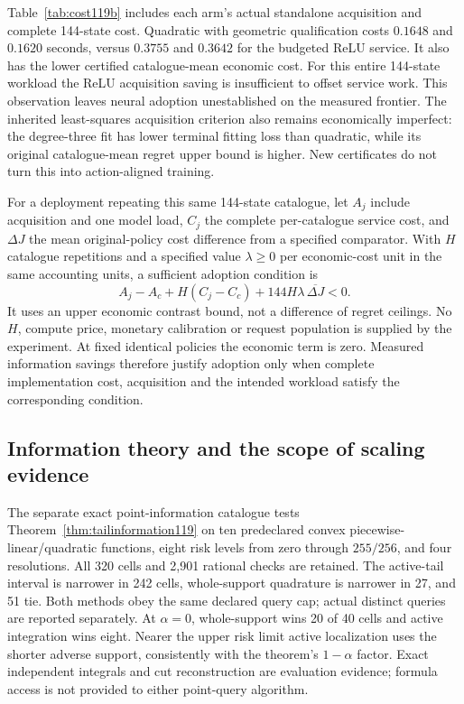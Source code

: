 Table~\ref{tab:cost119b} includes each arm's actual standalone acquisition
and complete 144-state cost.  Quadratic with geometric qualification costs
$0.1648$ and $0.1620$ seconds, versus $0.3755$ and $0.3642$ for the
budgeted ReLU service.  It also has the lower certified catalogue-mean
economic cost.  For this entire 144-state workload the ReLU acquisition
saving is insufficient to offset service work.  This observation leaves
neural adoption unestablished on the measured frontier.  The inherited
least-squares acquisition criterion also remains economically imperfect:
the degree-three fit has lower terminal fitting loss than quadratic,
while its original catalogue-mean regret upper bound is higher.  New
certificates do not turn this into action-aligned training.

For a deployment repeating this same 144-state catalogue, let $A_j$ include
acquisition and one model load, $C_j$ the complete per-catalogue service
cost, and $\Delta J$ the mean original-policy cost difference from a
specified comparator.  With $H$ catalogue repetitions and a specified
value $\lambda\ge0$ per economic-cost unit in the same accounting units,
a sufficient adoption condition is
\[
 A_j-A_c+H(C_j-C_c)+144H\lambda\,\overline{\Delta J}<0.
\]
It uses an upper economic contrast bound, not a difference of regret
ceilings.  No $H$, compute price, monetary calibration or request
population is supplied by the experiment.  At fixed identical policies
the economic term is zero.  Measured information savings therefore
justify adoption only when complete implementation cost, acquisition and
the intended workload satisfy the corresponding condition.

\subsection{Information theory and the scope of scaling evidence}
The separate exact point-information catalogue tests
Theorem~\ref{thm:tailinformation119} on ten predeclared convex
piecewise-linear/quadratic functions, eight risk levels from zero through
$255/256$, and four resolutions.  All 320 cells and 2,901 rational checks
are retained.  The active-tail interval is narrower in 242 cells,
whole-support quadrature is narrower in 27, and 51 tie.  Both methods
obey the same declared query cap; actual distinct queries are reported
separately.  At $\alpha=0$, whole-support wins 20 of 40 cells and active
integration wins eight.  Nearer the upper risk limit active localization
uses the shorter adverse support, consistently with the theorem's
$1-\alpha$ factor.  Exact independent integrals and cut reconstruction
are evaluation evidence; formula access is not provided to either
point-query algorithm.

